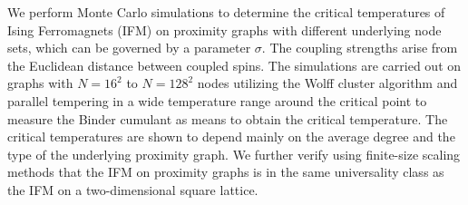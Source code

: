 We perform Monte Carlo simulations to determine the critical temperatures
of Ising Ferromagnets (IFM) on proximity graphs with different underlying
node sets, which can be governed by a parameter $\sigma$.
The coupling strengths arise from the Euclidean distance
between coupled spins.
The simulations are carried out on graphs with \(N=16^{2}\) to \(N=128^{2}\)
nodes utilizing the Wolff cluster algorithm and parallel tempering in a
wide temperature range around the critical point to measure
the Binder cumulant as means to obtain the critical temperature.
The critical temperatures are shown to depend mainly on the average degree
and the type of the underlying proximity graph.
We further verify using finite-size scaling methods that the IFM on proximity
graphs is in the same universality class as the IFM on a two-dimensional
square lattice.
